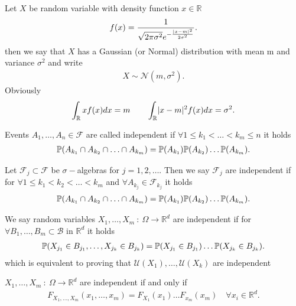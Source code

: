 \begin{example}
 Let $X$ be random variable with density function  $x \in  \mathbb{R}$
 \begin{align*}
  f(x) = \frac{1}{\sqrt{2\pi \sigma ^2}e^{-\frac{\abs{x-m}^2}{2\sigma ^2}}  }
 .\end{align*}
 then we say that $X$ has a Gaussian (or Normal) distribution with mean m and variance $\sigma^2$ and write
 \begin{align*}
  X \sim \mathcal{N}(m,\sigma^2)
 .\end{align*}
 Obviously 
 \begin{align*}
   \int_{\mathbb{R}} xf(x) dx = m \qquad \int_{\mathbb{R}}\abs{x-m}^2f(x) dx = \sigma^2
  .\end{align*}
\end{example}
\begin{definition}
  Events $A_{1},\ldots ,A_{n} \in  \mathcal{F}$ are called independent if $\forall 1 \le k_{1} < \ldots  < k_m \le  n$ it holds 
  \begin{align*}
    \P(A_{k_{1}}\cap A_{k_2} \cap \ldots \cap A_{k_m} )=\P(A_{k_{1}})\P(A_{k_{2}})\ldots \P(A_{k_m})
  .\end{align*}
\end{definition}
\begin{definition}
 Let $\mathcal{F}_j \subset  \mathcal{F}$   be $\sigma-$algebras for $j=1,2,\ldots $. Then we say $\mathcal{F}_j$ are independent if 
 for $\forall 1 \le k_{1}<k_{2}<\ldots <k_m$ and $\forall A_{k_j} \in  \mathcal{F}_{k_j}$ it holds
 \begin{align*}
  \P(A_{k_{1}}\cap A_{k_2} \cap \ldots \cap A_{k_m} )=\P(A_{k_{1}})\P(A_{k_{2}})\ldots \P(A_{k_m})
 .\end{align*}
\end{definition}
\begin{definition}
 We say random variables $X_{1},\ldots ,X_m \ : \ \Omega  \to \mathbb{R}^{d} $  are independent if 
 for $\forall  B_{1},\ldots ,B_{m} \subset  \mathcal{B}$ in $\mathbb{R}^{d} $ it holds 
 \begin{align*}
   \P(X_{j_{1}}\in B_{j_{1}},\ldots, X_{j_k}\in B_{j_k} ) = \P(X_{j_{1}} \in  B_{j_{1}})\ldots \P(X_{j_k} \in  B_{j_k})
 .\end{align*}
 which is equivalent to proving that $\mathcal{U}(X_{1}),\ldots ,\mathcal{U}(X_k)$ are independent
\end{definition}
\begin{theorem}
 $X_{1},\ldots ,X_m \ : \ \Omega  \to \mathbb{R}^{d} $ are independent if and only if 
 \begin{align*}
   F_{X_{1},\ldots ,X_m}(x_{1},\ldots ,x_m) =F_{X_{1}}(x_{1})\ldots F_{x_m}(x_m) \quad \forall  x_i \in \mathbb{R}^{d} 
 .\end{align*}
\end{theorem}
